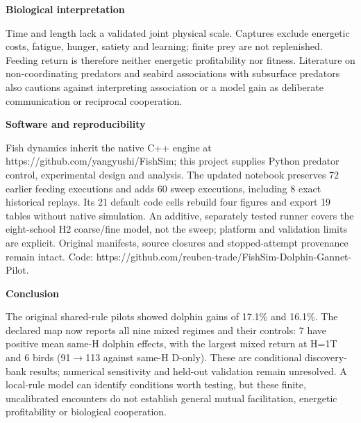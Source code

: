 \documentclass[10pt,a4paper]{article}
\begin{document}
\begin{minipage}[t]{238.10999999999999pt}\vspace{0pt}
\textbf{Biological interpretation}\par Time and length lack a validated joint physical scale. Captures exclude energetic costs, fatigue, hunger, satiety and learning; finite prey are not replenished. Feeding return is therefore neither energetic profitability nor fitness. Literature on non-coordinating predators \citep{mohapatra2025} and seabird associations with subsurface predators \citep{licht2026} also cautions against interpreting association or a model gain as deliberate communication or reciprocal cooperation.\par\smallskip
\textbf{Software and reproducibility}\par Fish dynamics inherit the native C++ engine at https://github.com/yangyushi/FishSim; this project supplies Python predator control, experimental design and analysis. The updated notebook preserves 72 earlier feeding executions and adds 60 sweep executions, including 8 exact historical replays. Its 21 default code cells rebuild four figures and export 19 tables without native simulation. An additive, separately tested runner covers the eight-school H2 coarse/fine model, not the sweep; platform and validation limits are explicit. Original manifests, source closures and stopped-attempt provenance remain intact. Code: https://github.com/reuben-trade/FishSim-Dolphin-Gannet-Pilot.\par\smallskip
\textbf{Conclusion}\par The original shared-rule pilots showed dolphin gains of 17.1\% and 16.1\%. The declared map now reports all nine mixed regimes and their controls: 7 have positive mean same-H dolphin effects, with the largest mixed return at H=1T and 6 birds (91\ensuremath{\rightarrow}113 against same-H D-only). These are conditional discovery-bank results; numerical sensitivity and held-out validation remain unresolved. A local-rule model can identify conditions worth testing, but these finite, uncalibrated encounters do not establish general mutual facilitation, energetic profitability or biological cooperation.\par\smallskip
\end{minipage}
\twocolumn
\end{document}
